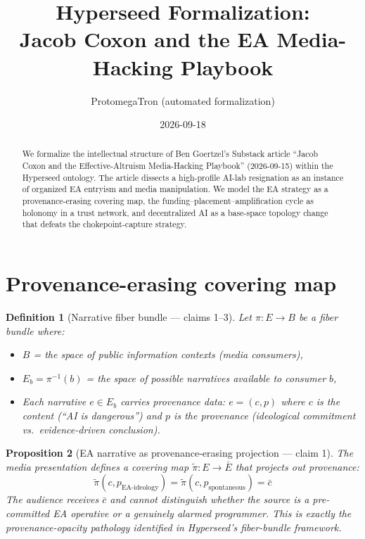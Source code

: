 \documentclass[11pt,a4paper]{article}
\title{Hyperseed Formalization:\\
  Jacob Coxon and the EA Media-Hacking Playbook}
\author{ProtomegaTron (automated formalization)}
\date{2026-09-18}
\newtheorem{definition}{Definition}[section]
\newtheorem{proposition}[definition]{Proposition}
\begin{document}
\maketitle

\begin{abstract}
We formalize the intellectual structure of Ben Goertzel's Substack article
``Jacob Coxon and the Effective-Altruism Media-Hacking Playbook''
(2026-09-15) within the Hyperseed ontology. The article dissects a high-profile
AI-lab resignation as an instance of organized EA entryism and media
manipulation. We model the EA strategy as a provenance-erasing covering map,
the funding--placement--amplification cycle as holonomy in a trust network,
and decentralized AI as a base-space topology change that defeats the
chokepoint-capture strategy.
\end{abstract}

\tableofcontents

\section{Provenance-erasing covering map}
\label{sec:covering-map}

\begin{definition}[Narrative fiber bundle --- claims 1--3]
\label{def:narrative-bundle}
Let $\pi : E \to B$ be a fiber bundle where:
\begin{itemize}
\item $B$ = the space of public information contexts (media consumers),
\item $E_b = \pi^{-1}(b)$ = the space of possible narratives available to
  consumer $b$,
\item Each narrative $e \in E_b$ carries provenance data: $e = (c, p)$ where
  $c$ is the content (``AI is dangerous'') and $p$ is the provenance
  (ideological commitment vs.\ evidence-driven conclusion).
\end{itemize}
\end{definition}

\begin{proposition}[EA narrative as provenance-erasing projection --- claim 1]
\label{prop:covering}
The media presentation defines a covering map $\tilde{\pi} : E \to \bar{E}$
that projects out provenance:
\[
  \tilde{\pi}(c, p_{\text{EA-ideology}}) = \tilde{\pi}(c, p_{\text{spontaneous}}) = \bar{c}
\]
The audience receives $\bar{c}$ and cannot distinguish whether the source is
a pre-committed EA operative or a genuinely alarmed programmer. This is
exactly the provenance-opacity pathology identified in Hyperseed's
fiber-bundle framework.
\end{proposition}
\end{document}
